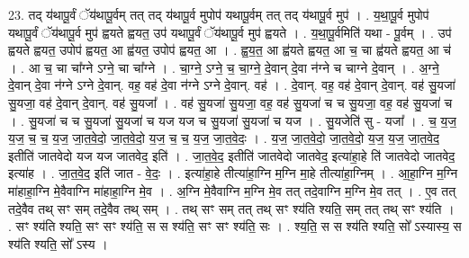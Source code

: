 \documentclass[17pt]{extarticle}
\begin{document}
23. तद् य॑थापू॒र्वं ॅय॑थापू॒र्वम् तत् तद् य॑थापू॒र्व मुपोप॑ यथापू॒र्वम् तत् तद् य॑थापू॒र्व मुप॑ । . य॒था॒पू॒र्व मुपोप॑ यथापू॒र्वं ॅय॑थापू॒र्व मुप॑ ह्वयते ह्वयत॒ उप॑ यथापू॒र्वं ॅय॑थापू॒र्व मुप॑ ह्वयते । . य॒था॒पू॒र्वमिति॑ यथा - पू॒र्वम् । . उप॑ ह्वयते ह्वयत॒ उपोप॑ ह्वयत॒ आ ह्व॑यत॒ उपोप॑ ह्वयत॒ आ । . ह्व॒य॒त॒ आ ह्व॑यते ह्वयत॒ आ च॒ चा ह्व॑यते ह्वयत॒ आ च॑ । . आ च॒ चा चा᳚ग्ने ऽग्ने॒ चा चा᳚ग्ने । . चा॒ग्ने॒ ऽग्ने॒ च॒ चा॒ग्ने॒ दे॒वान् दे॒वा न॑ग्ने च चाग्ने दे॒वान् । . अ॒ग्ने॒ दे॒वान् दे॒वा न॑ग्ने ऽग्ने दे॒वान्. वह॒ वह॑ दे॒वा न॑ग्ने ऽग्ने दे॒वान्. वह॑ । . दे॒वान्. वह॒ वह॑ दे॒वान् दे॒वान्. वह॑ सु॒यजा॑ सु॒यजा॒ वह॑ दे॒वान् दे॒वान्. वह॑ सु॒यजा᳚ । . वह॑ सु॒यजा॑ सु॒यजा॒ वह॒ वह॑ सु॒यजा॑ च च सु॒यजा॒ वह॒ वह॑ सु॒यजा॑ च । . सु॒यजा॑ च च सु॒यजा॑ सु॒यजा॑ च यज यज च सु॒यजा॑ सु॒यजा॑ च यज । . सु॒यजेति॑ सु - यजा᳚ । . च॒ य॒ज॒ य॒ज॒ च॒ च॒ य॒ज॒ जा॒त॒वे॒दो॒ जा॒त॒वे॒दो॒ य॒ज॒ च॒ च॒ य॒ज॒ जा॒त॒वे॒दः॒ । . य॒ज॒ जा॒त॒वे॒दो॒ जा॒त॒वे॒दो॒ य॒ज॒ य॒ज॒ जा॒त॒वे॒द॒ इतीति॑ जातवेदो यज यज जातवेद॒ इति॑ । . जा॒त॒वे॒द॒ इतीति॑ जातवेदो जातवेद॒ इत्या॑हा॒हे ति॑ जातवेदो जातवेद॒ इत्या॑ह । . जा॒त॒वे॒द॒ इति॑ जात - वे॒दः॒ । . इत्या॑हा॒हे तीत्या॑हा॒ग्नि म॒ग्नि मा॒हे तीत्या॑हा॒ग्निम् । . आ॒हा॒ग्नि म॒ग्नि मा॑हाहा॒ग्नि मे॒वैवाग्नि मा॑हाहा॒ग्नि मे॒व । . अ॒ग्नि मे॒वैवाग्नि म॒ग्नि मे॒व तत् तदे॒वाग्नि म॒ग्नि मे॒व तत् । . ए॒व तत् तदे॒वैव तथ् सꣳ सम् तदे॒वैव तथ् सम् । . तथ् सꣳ सम् तत् तथ् सꣳ श्य॑ति श्यति॒ सम् तत् तथ् सꣳ श्य॑ति । . सꣳ श्य॑ति श्यति॒ सꣳ सꣳ श्य॑ति॒ स स श्य॑ति॒ सꣳ सꣳ श्य॑ति॒ सः । . श्य॒ति॒ स स श्य॑ति श्यति॒ सो᳚ ऽस्यास्य॒ स श्य॑ति श्यति॒ सो᳚ ऽस्य । \newline
\end{document}
